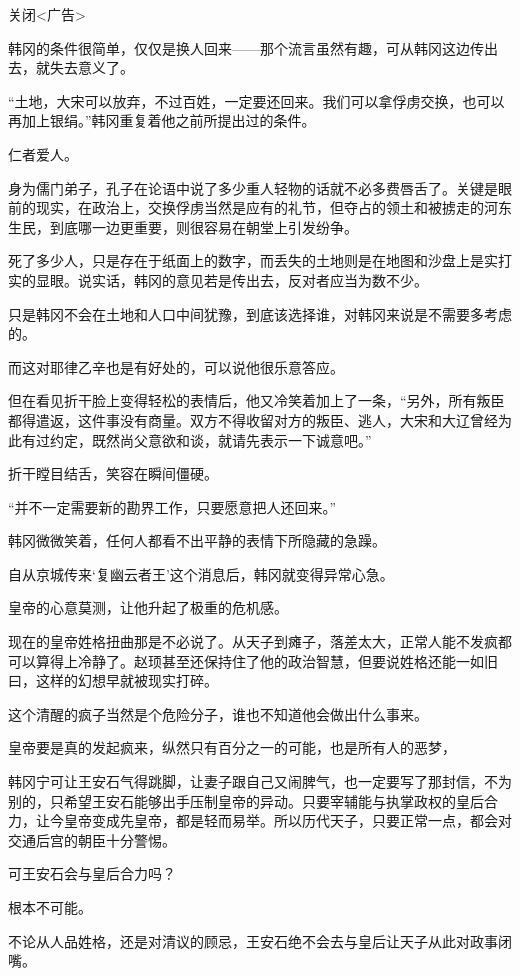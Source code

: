 关闭<广告>

韩冈的条件很简单，仅仅是换人回来——那个流言虽然有趣，可从韩冈这边传出去，就失去意义了。

“土地，大宋可以放弃，不过百姓，一定要还回来。我们可以拿俘虏交换，也可以再加上银绢。”韩冈重复着他之前所提出过的条件。

仁者爱人。

身为儒门弟子，孔子在论语中说了多少重人轻物的话就不必多费唇舌了。关键是眼前的现实，在政治上，交换俘虏当然是应有的礼节，但夺占的领土和被掳走的河东生民，到底哪一边更重要，则很容易在朝堂上引发纷争。

死了多少人，只是存在于纸面上的数字，而丢失的土地则是在地图和沙盘上是实打实的显眼。说实话，韩冈的意见若是传出去，反对者应当为数不少。

只是韩冈不会在土地和人口中间犹豫，到底该选择谁，对韩冈来说是不需要多考虑的。

而这对耶律乙辛也是有好处的，可以说他很乐意答应。

但在看见折干脸上变得轻松的表情后，他又冷笑着加上了一条，“另外，所有叛臣都得遣返，这件事没有商量。双方不得收留对方的叛臣、逃人，大宋和大辽曾经为此有过约定，既然尚父意欲和谈，就请先表示一下诚意吧。”

折干瞠目结舌，笑容在瞬间僵硬。

“并不一定需要新的勘界工作，只要愿意把人还回来。”

韩冈微微笑着，任何人都看不出平静的表情下所隐藏的急躁。

自从京城传来‘复幽云者王’这个消息后，韩冈就变得异常心急。

皇帝的心意莫测，让他升起了极重的危机感。

现在的皇帝姓格扭曲那是不必说了。从天子到瘫子，落差太大，正常人能不发疯都可以算得上冷静了。赵顼甚至还保持住了他的政治智慧，但要说姓格还能一如旧曰，这样的幻想早就被现实打碎。

这个清醒的疯子当然是个危险分子，谁也不知道他会做出什么事来。

皇帝要是真的发起疯来，纵然只有百分之一的可能，也是所有人的恶梦，

韩冈宁可让王安石气得跳脚，让妻子跟自己又闹脾气，也一定要写了那封信，不为别的，只希望王安石能够出手压制皇帝的异动。只要宰辅能与执掌政权的皇后合力，让今皇帝变成先皇帝，都是轻而易举。所以历代天子，只要正常一点，都会对交通后宫的朝臣十分警惕。

可王安石会与皇后合力吗？

根本不可能。

不论从人品姓格，还是对清议的顾忌，王安石绝不会去与皇后让天子从此对政事闭嘴。

